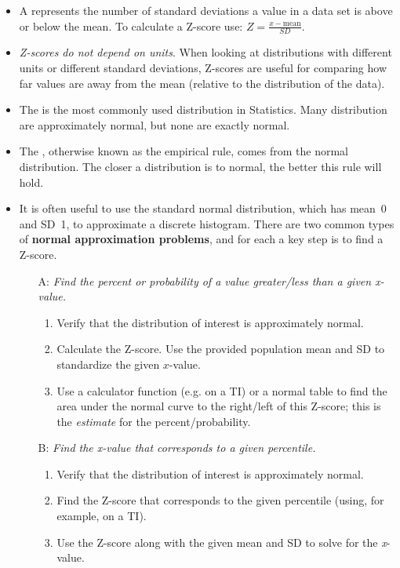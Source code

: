 \begin{itemize}
\item A  represents the number of standard deviations a value in a data set is above or below the mean.  To calculate a \mbox{Z-score} use: $Z = \frac{x-\text{mean}}{SD}$.  

\item \emph{Z-scores do not depend on units}.  When looking at distributions with different units or different standard deviations, \mbox{Z-scores} are useful for comparing how far values are away from the mean (relative to the distribution of the data). 

\item The  is the most commonly used distribution in Statistics.  Many distribution are approximately normal, but none are exactly normal.  

\item The , otherwise known as the empirical rule, comes from the normal distribution.  The closer a distribution is to normal, the better this rule will hold.

\item It is often useful to use the standard normal distribution, which has mean~0 and SD~1, to approximate a discrete histogram.  There are two common types of \textbf{normal approximation problems}, and for each a key step is to find a \mbox{Z-score}.   
\begin{itemize}
\item[A:] \textit{Find the percent or probability of a value greater/less than a given \textit{x}-value.  }
\begin{enumerate}\vspace{-1mm}
\setlength{\itemsep}{0mm}
\item Verify that the distribution of interest is approximately normal.
\item Calculate the \mbox{Z-score}.  Use the provided population mean and SD to standardize the given $x$-value.
\item Use a calculator function (e.g.  on a TI) or a normal table to find the area under the normal curve to the right/left of this \mbox{Z-score}; this is the \textit{estimate} for the percent/probability.
\end{enumerate}

\item[B:] \textit{Find the \textit{x}-value that corresponds to a given percentile.}
\begin{enumerate}\vspace{-1mm}
\setlength{\itemsep}{0mm}
\item Verify that the distribution of interest is approximately normal.
\item Find the Z-score that corresponds to the given percentile (using, for example,  on a TI).  
\item Use the Z-score along with the given mean and SD to solve for the \textit{x}-value.  
\end{enumerate}
\end{itemize}


\end{itemize}
